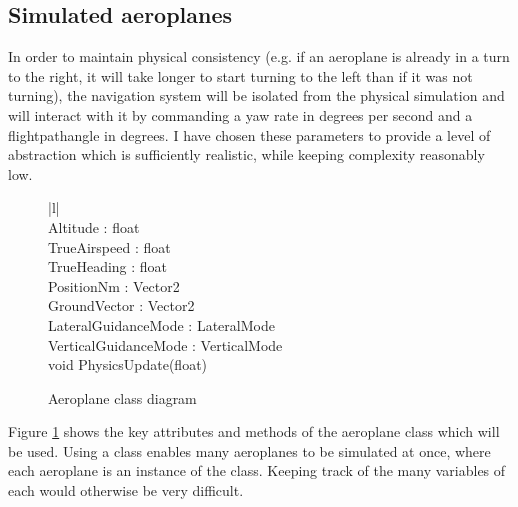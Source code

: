 \documentclass{article}
\begin{document}
\subsection{Simulated aeroplanes}
In order to maintain physical consistency (e.g. if an aeroplane is already in a turn to the right, it will take longer to start turning to the left than if it was not turning), the navigation system will be isolated from the physical simulation and will interact with it by commanding a yaw rate in degrees per second and a \gls{flightpathangle} in degrees.
I have chosen these parameters to provide a level of abstraction which is sufficiently realistic, while keeping complexity reasonably low.
\begin{figure}[H]
\centering
\begin{tabular}{ |l| } 
\hline
{} \\
\hline
Altitude : float \\ 
TrueAirspeed : float \\
TrueHeading : float \\
PositionNm : Vector2 \\
GroundVector : Vector2 \\
LateralGuidanceMode : LateralMode \\
VerticalGuidanceMode : VerticalMode \\
\hline
void PhysicsUpdate(float) \\
\hline
\end{tabular}
\caption{\label{fig:aeroplaneclass}Aeroplane class diagram}
\end{figure}
Figure \ref{fig:aeroplaneclass} shows the key attributes and methods of the aeroplane class which will be used.
Using a class enables many aeroplanes to be simulated at once, where each aeroplane is an instance of the class.
Keeping track of the many variables of each would otherwise be very difficult.
\end{document}
